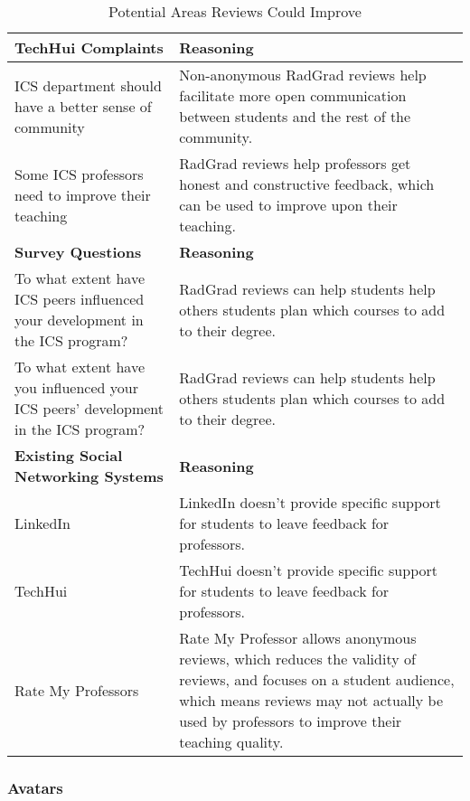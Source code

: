 \begin{table}[htbp!]
\centering
 \caption{Potential Areas Reviews Could Improve}
\begin{tabular}{  |p{4cm}|p{12cm}| } 
\hline
 \textbf{TechHui Complaints} & \textbf{Reasoning} \\ 
  \hline
  ICS department should have a better sense of community & Non-anonymous RadGrad reviews help facilitate more open communication between students and the rest of the community.\\
  \hline
    Some ICS professors need to improve their teaching & RadGrad reviews help professors get honest and constructive feedback, which can be used to improve upon their teaching.\\
  \hline
 \textbf{Survey Questions} & \textbf{Reasoning} \\ 
  \hline
    To what extent have ICS peers influenced your development in the ICS program? & RadGrad reviews can help students help others students plan which courses to add to their degree. \\
      \hline
    To what extent have you influenced your ICS peers' development in the ICS program? & RadGrad reviews can help students help others students plan which courses to add to their degree. \\
   \hline
   \textbf{Existing Social Networking Systems} & \textbf{Reasoning} \\ 
  \hline
  LinkedIn & LinkedIn doesn't provide specific support for students to leave feedback for professors. \\
    \hline
  TechHui & TechHui doesn't provide specific support for students to leave feedback for professors. \\
    \hline
  Rate My Professors & Rate My Professor allows anonymous reviews, which reduces the validity of reviews, and focuses on a student audience, which means reviews may not actually be used by professors to improve their teaching quality.  \\
    \hline\end{tabular}
\end{table}

\subsubsection{Avatars}

